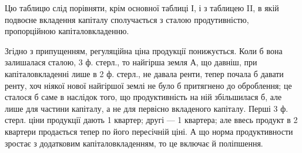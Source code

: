 Цю таблицю слід порівняти, крім основної таблиці І, і з таблицею II, в якій
подвоєне вкладення капіталу сполучається з сталою продутивністю, пропорційною
капіталовкладенню.

Згідно з припущенням, регуляційна ціна продукції понижується. Коли б
вона залишалася сталою, 3 ф. стерл., то найгірша земля $А$, що давніш, при
капіталовкладенні лише в 2 ф. стерл., не давала ренти, тепер почала б давати
ренту, хоч ніякої нової найгіршої землі не було б притягнено до оброблення;
це сталося б саме в наслідок того, що продуктивність на ній збільшилася б, але
лише для частини капіталу, а не для первісно вкладеного капіталу. Перші 3 ф.
стерл. ціни продукції дають 1 квартер; другі — 1 квартера; але ввесь продукт в
2 квартери продається тепер по його пересічній ціні. А що норма продуктивности
зростає з додатковим капіталовкладенням, то це включає й поліпшення.
